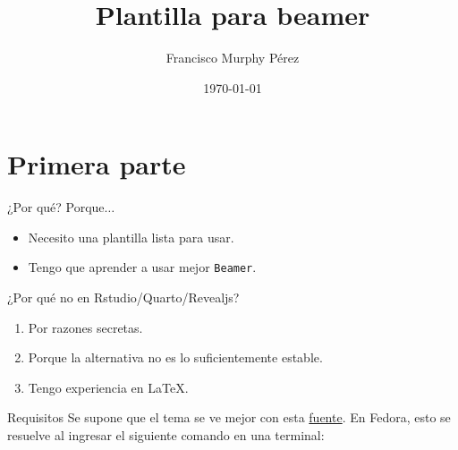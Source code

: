 \documentclass[spanish,mexico]{beamer}
\title{Plantilla para beamer}
\date{\today}
\author{Francisco Murphy Pérez}
\institute{Instituto de Biotecnología - Universidad Nacional Autónoma de México}
\begin{document}
	\maketitle
	\section{Primera parte}
	\begin{frame}{¿Por qué?}
		Porque$\ldots$
		\begin{itemize}
			\item Necesito una plantilla lista para usar.
			\item Tengo que aprender a usar mejor \texttt{Beamer}.
		\end{itemize}
	\end{frame}
	\begin{frame}{¿Por qué no en Rstudio/Quarto/Revealjs?}
		\begin{enumerate}
			\item Por razones secretas.
			\item Porque la alternativa no es lo suficientemente estable.
			\item Tengo experiencia en \LaTeX{}.
		\end{enumerate}
	\end{frame}
	\begin{frame}[fragile]{Requisitos}
		Se supone que el tema se ve mejor con esta \href{https://mozilla.github.io/Fira/}{fuente}.
		En Fedora, esto se resuelve al ingresar el siguiente comando en una terminal:\\
		
	\end{frame}
\end{document}
